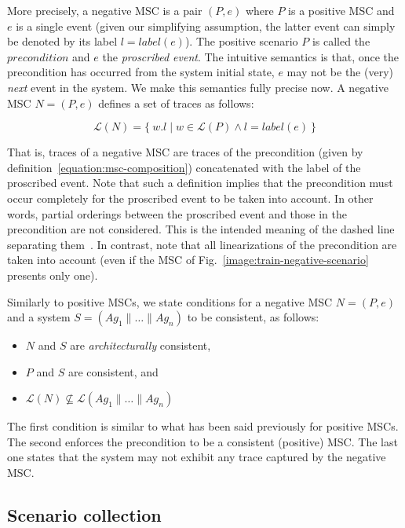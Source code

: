 More precisely, a negative MSC is a pair $(P,e)$ where $P$ is a positive MSC and $e$ is a single event (given our simplifying assumption, the latter event can simply be denoted by its label $l = label(e)$). The positive scenario $P$ is called the $precondition$ and $e$ the \emph{proscribed event}. The intuitive semantics is that, once the precondition has occurred from the system initial state, $e$ may not be the (very) \emph{next} event in the system. We make this semantics fully precise now. A negative MSC $N = (P,e)$ defines a set of traces as follows:

\begin{equation*}
\mathcal{L}(N) = \{~w.l \mid w \in \mathcal{L}(P) \wedge l = label(e)~\}
\end{equation*}

That is, traces of a negative MSC are traces of the precondition (given by definition~\ref{equation:msc-composition}) concatenated with the label of the proscribed event. Note that such a definition implies that the precondition must occur completely for the proscribed event to be taken into account. In other words, partial orderings between the proscribed event and those in the precondition are not considered. This is the intended meaning of the dashed line separating them~\cite{Uchitel:2004}. In contrast, note that all linearizations of the precondition are taken into account (even if the MSC of Fig.~\ref{image:train-negative-scenario} presents only one). 

Similarly to positive MSCs, we state conditions for a negative MSC $N = (P,e)$ and a system $S = (Ag_1 \parallel \ldots \parallel Ag_n)$ to be consistent, as follows:

\begin{itemize}
\item $N$ and $S$ are \emph{architecturally} consistent,
\item $P$ and $S$ are consistent, and
\item $\mathcal{L}(N) \not\subseteq \mathcal{L}(Ag_1 \parallel \ldots \parallel Ag_n)$
\end{itemize}

The first condition is similar to what has been said previously for positive MSCs. The second enforces the precondition to be a consistent (positive) MSC. The last one states that the system may not exhibit any trace captured by the negative MSC.

\subsection{Scenario collection}


